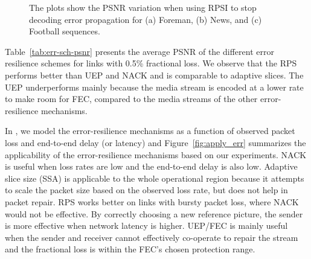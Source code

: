 \begin{figure}[!t]
  \centerline{
}
\caption{The plots show the PSNR variation when using RPSI to stop decoding
error propagation for (a) Foreman, (b) News, and (c) Football sequences.}
\label{fig:rpsi_sim}
\end{figure}

Table~\ref{tab:err-sch-psnr} presents the average PSNR of the different error
resilience schemes for links with 0.5\% fractional loss. We observe that the
RPS performs better than UEP and NACK and is comparable to adaptive slices.
The UEP underperforms mainly because the media stream is encoded at a lower
rate to make room for FEC, compared to the media streams of the other
error-resilience mechanisms.

\begin{table}
\caption{Comparing the performance of different error-resilience
schemes on three different types of YUV sequences~\cite{YUV_seq}. The link
loss rate is 0.5\% at each 3G link.}
\label{tab:err-sch-psnr}
\end{table}

In , we model the error-resilience mechanisms as a function of
observed packet loss and end-to-end delay (or latency) and
Figure~\ref{fig:apply_err} summarizes the applicability of the
error-resilience mechanisms based on our experiments. NACK is useful when loss
rates are low and the end-to-end delay is also low. Adaptive slice size (SSA)
is applicable to the whole operational region because it attempts to scale the
packet size based on the observed loss rate, but does not help in packet
repair. RPS works better on links with bursty packet loss, where NACK would
not be effective. By correctly choosing a new reference picture, the sender is
more effective when network latency is higher. UEP/FEC is mainly useful when
the sender and receiver cannot effectively co-operate to repair the stream and
the fractional loss is within the FEC's chosen protection range.


